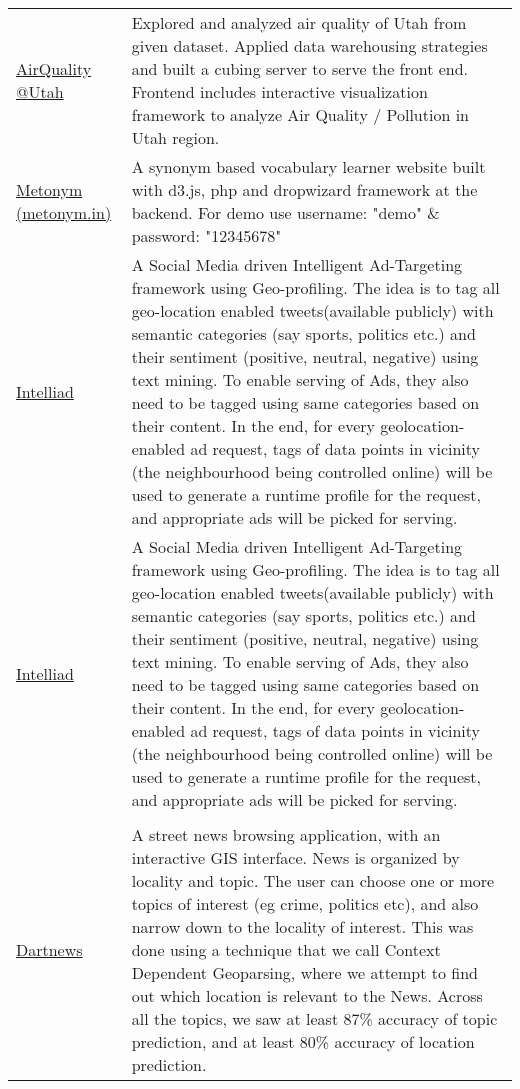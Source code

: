\documentclass[8pt]{article}
\renewcommand{\section}[2]%
        {\pagebreak[2]\vspace{1.3\baselineskip}%
         \phantomsection\addcontentsline{toc}{section}{#1}%
         \hspace{0in}%
         \marginpar{
         \raggedright \scshape #1}#2}
\begin{document}
\section{Projects}
\begin{tabular}[t]{@{}p{\textwidth-\rcollength-130pt}p{\rcollength+130pt}}
        
        \href{http://debjyoti385.github.io/AirQuality/}{AirQuality @Utah } & Explored and analyzed air quality of Utah from given dataset. Applied data warehousing strategies and built a cubing server to serve the front end. Frontend includes interactive visualization framework to analyze Air Quality / Pollution in Utah region.  \\
    \href{http://metonym.in}{Metonym (metonym.in)} & A synonym based vocabulary learner website built with d3.js, php and dropwizard framework at the backend. For demo use username: "demo" \& password: "12345678"  \\
    \href{}{Intelliad} &  A Social Media driven Intelligent Ad-Targeting framework using Geo-profiling. The idea is to tag all geo-location enabled tweets(available publicly) with semantic categories (say sports, politics etc.) and their sentiment (positive, neutral, negative) using text mining. To enable serving of Ads, they also need to be tagged using same categories based on their content. In the end, for every geolocation-enabled ad request, tags of data points in vicinity (the neighbourhood being controlled online) will be used to generate a runtime profile for the request, and appropriate ads will be picked for serving.  \\
    \href{http://github.com/debjyoti385/intelliad}{Intelliad} &  A Social Media driven Intelligent Ad-Targeting framework using Geo-profiling. The idea is to tag all geo-location enabled tweets(available publicly) with semantic categories (say sports, politics etc.) and their sentiment (positive, neutral, negative) using text mining. To enable serving of Ads, they also need to be tagged using same categories based on their content. In the end, for every geolocation-enabled ad request, tags of data points in vicinity (the neighbourhood being controlled online) will be used to generate a runtime profile for the request, and appropriate ads will be picked for serving.  \\
       \\
       \href{http://github.com/debjyoti385/dartnews}{Dartnews}   & A street news browsing application, with an interactive GIS interface. News is organized by locality and topic. The user can choose one or more topics of interest (eg crime, politics etc), and also narrow down to the locality of interest. This was done using a technique that we call Context Dependent Geoparsing, where we attempt to find out which location is relevant to the News. Across all the topics, we saw at least 87\% accuracy of topic prediction, and at least 80\% accuracy of location prediction.\\

\end{tabular}
\end{document}

